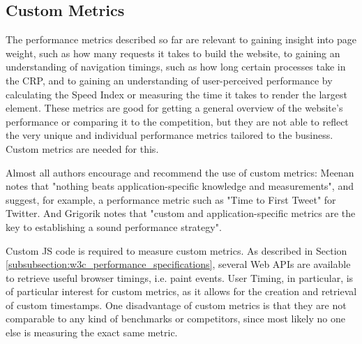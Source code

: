 \subsection{Custom Metrics} %
\label{subsection:custom_metrics}


The performance metrics described so far are relevant to gaining insight into page weight, such as how many requests it takes to build the website, to gaining an understanding of navigation timings, such as how long certain processes take in the CRP, and to gaining an understanding of user-perceived performance by calculating the Speed Index or measuring the time it takes to render the largest element.
These metrics are good for getting a general overview of the website's performance or comparing it to the competition, but they are not able to reflect the very unique and individual performance metrics tailored to the business.
Custom metrics are needed for this.



Almost all authors encourage and recommend the use of custom metrics:
Meenan notes that "nothing beats application-specific knowledge and measurements", and suggest, for example, a performance metric such as "Time to First Tweet" for Twitter. %
And Grigorik notes that "custom and application-specific metrics are the key to establishing a sound performance strategy". %



Custom JS code is required to measure custom metrics.
As described in Section \ref{subsubsection:w3c_performance_specifications}, several Web APIs are available to retrieve useful browser timings, i.e. paint events.
User Timing, in particular, is of particular interest for custom metrics, as it allows for the creation and retrieval of custom timestamps.
One disadvantage of custom metrics is that they are not comparable to any kind of benchmarks or competitors, since most likely no one else is measuring the exact same metric.


